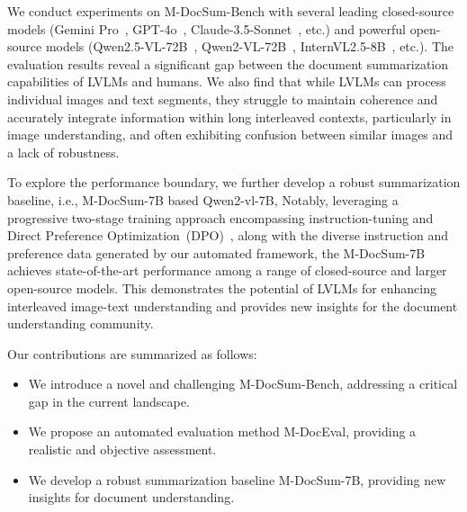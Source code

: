 We conduct experiments on M-DocSum-Bench with several leading closed-source models (Gemini Pro~\cite{team2024gemini}, GPT-4o~\cite{openai_gpt4o}, Claude-3.5-Sonnet~\cite{TheC3}, etc.) and powerful open-source models (Qwen2.5-VL-72B~\cite{bai2025qwen2}, Qwen2-VL-72B~\cite{wang2024qwen2}, InternVL2.5-8B~\cite{chen2024expanding}, etc.).
The evaluation results reveal a significant gap between the document summarization capabilities of LVLMs and humans.
We also find that while LVLMs can process individual images and text segments, they struggle to maintain coherence and accurately integrate information within long interleaved contexts, particularly in image understanding, and often exhibiting confusion between similar images and a lack of robustness.

To explore the performance boundary, we further develop a robust summarization baseline, i.e., M-DocSum-7B based Qwen2-vl-7B,
Notably, leveraging a progressive two-stage training approach encompassing instruction-tuning and Direct Preference Optimization~(DPO)~\cite{rafailov2023direct}, along with the diverse instruction and preference data generated by our automated framework, the M-DocSum-7B achieves state-of-the-art performance among a range of closed-source and larger open-source models.
This demonstrates the potential of LVLMs for enhancing interleaved image-text understanding and provides new insights for the document understanding community.

Our contributions are summarized as follows:

\begin{itemize}
\item We introduce a novel and challenging M-DocSum-Bench, addressing a critical gap in the current landscape.
\item We propose an automated evaluation method M-DocEval, providing a realistic and objective assessment.
\item We develop a robust summarization baseline M-DocSum-7B, providing new insights for document understanding.
\end{itemize}


